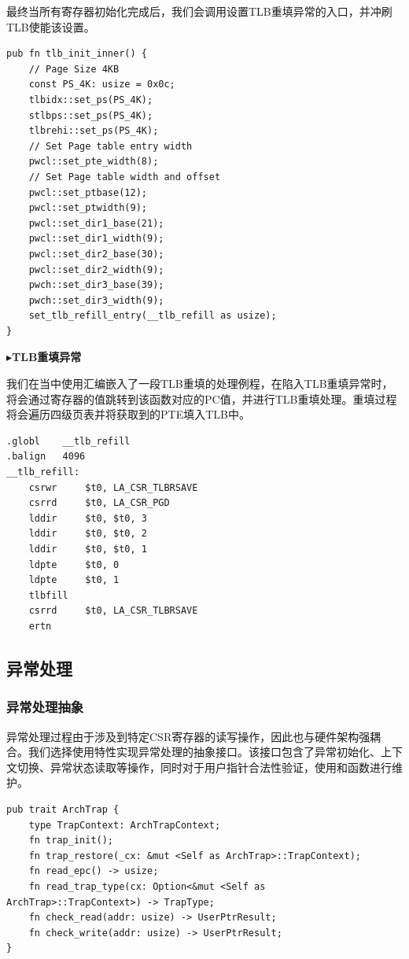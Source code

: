 \documentclass{article}
\begin{document}
最终当所有寄存器初始化完成后，我们会调用设置TLB重填异常的入口，并冲刷TLB使能该设置。

\begin{lstlisting}
pub fn tlb_init_inner() {
    // Page Size 4KB
    const PS_4K: usize = 0x0c;
    tlbidx::set_ps(PS_4K);
    stlbps::set_ps(PS_4K);
    tlbrehi::set_ps(PS_4K);
    // Set Page table entry width
    pwcl::set_pte_width(8);
    // Set Page table width and offset
    pwcl::set_ptbase(12);
    pwcl::set_ptwidth(9);
    pwcl::set_dir1_base(21);
    pwcl::set_dir1_width(9);
    pwcl::set_dir2_base(30);
    pwcl::set_dir2_width(9);
    pwch::set_dir3_base(39);
    pwch::set_dir3_width(9);
    set_tlb_refill_entry(__tlb_refill as usize);
}
\end{lstlisting}

$\blacktriangleright$\textbf{TLB重填异常}

我们在当中使用汇编嵌入了一段TLB重填的处理例程，在陷入TLB重填异常时，将会通过寄存器的值跳转到该函数对应的PC值，并进行TLB重填处理。重填过程将会遍历四级页表并将获取到的PTE填入TLB中。

\begin{lstlisting}
.globl    __tlb_refill
.balign   4096
__tlb_refill:
    csrwr     $t0, LA_CSR_TLBRSAVE
    csrrd     $t0, LA_CSR_PGD
    lddir     $t0, $t0, 3
    lddir     $t0, $t0, 2
    lddir     $t0, $t0, 1
    ldpte     $t0, 0
    ldpte     $t0, 1
    tlbfill
    csrrd     $t0, LA_CSR_TLBRSAVE
    ertn
\end{lstlisting}

\subsection{异常处理}

\subsubsection{异常处理抽象}

异常处理过程由于涉及到特定CSR寄存器的读写操作，因此也与硬件架构强耦合。我们选择使用特性实现异常处理的抽象接口。该接口包含了异常初始化、上下文切换、异常状态读取等操作，同时对于用户指针合法性验证，使用和函数进行维护。

\begin{lstlisting}
pub trait ArchTrap {
    type TrapContext: ArchTrapContext;
    fn trap_init();
    fn trap_restore(_cx: &mut <Self as ArchTrap>::TrapContext);
    fn read_epc() -> usize;
    fn read_trap_type(cx: Option<&mut <Self as ArchTrap>::TrapContext>) -> TrapType;
    fn check_read(addr: usize) -> UserPtrResult;
    fn check_write(addr: usize) -> UserPtrResult;
}
\end{lstlisting}
\end{document}
